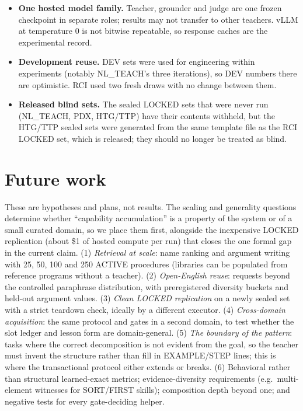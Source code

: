 \documentclass[10pt]{article}
\begin{document}
\begin{itemize}
\item \textbf{One hosted model family.} Teacher, grounder and judge are one frozen checkpoint in separate roles; results may not transfer to other teachers. vLLM at temperature 0 is not bitwise repeatable, so response caches are the experimental record.
\item \textbf{Development reuse.} DEV sets were used for engineering within experiments (notably NL\_TEACH's three iterations), so DEV numbers there are optimistic. RCI used two fresh draws with no change between them.
\item \textbf{Released blind sets.} The sealed LOCKED sets that were never run (NL\_TEACH, PDX, HTG/TTP) have their contents withheld, but the HTG/TTP sealed sets were generated from the same template file as the RCI LOCKED set, which is released; they should no longer be treated as blind.
\end{itemize}

\section{Future work}\label{sec:future}
These are hypotheses and plans, not results. The scaling and generality questions determine whether ``capability accumulation'' is a property of the system or of a small curated domain, so we place them first, alongside the inexpensive LOCKED replication (about \$1 of hosted compute per run) that closes the one formal gap in the current claim.
(1) \emph{Retrieval at scale}: name ranking and argument writing with 25, 50, 100 and 250 ACTIVE procedures (libraries can be populated from reference programs without a teacher). (2) \emph{Open-English reuse}: requests beyond the controlled paraphrase distribution, with preregistered diversity buckets and held-out argument values. (3) \emph{Clean LOCKED replication} on a newly sealed set with a strict teardown check, ideally by a different executor. (4) \emph{Cross-domain acquisition}: the same protocol and gates in a second domain, to test whether the slot ledger and lesson form are domain-general. (5) \emph{The boundary of the pattern}: tasks where the correct decomposition is not evident from the goal, so the teacher must invent the structure rather than fill in EXAMPLE/STEP lines; this is where the transactional protocol either extends or breaks. (6) Behavioral rather than structural learned-exact metrics; evidence-diversity requirements (e.g.\ multi-element witnesses for SORT/FIRST skills); composition depth beyond one; and negative tests for every gate-deciding helper.
\end{document}

